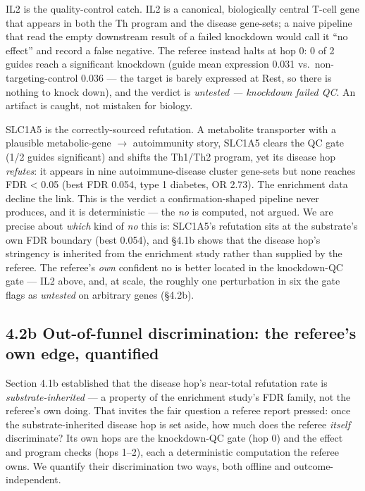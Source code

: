 IL2 is the quality-control catch. IL2 is a canonical, biologically central T-cell gene that appears in both
the Th program and the disease gene-sets; a naive pipeline that read the empty downstream result of a
failed knockdown would call it ``no effect'' and record a false negative. The referee instead halts at hop 0:
0 of 2 guides reach a significant knockdown (guide mean expression 0.031 vs.~non-targeting-control 0.036 ---
the target is barely expressed at Rest, so there is nothing to knock down), and the verdict is \emph{untested ---
knockdown failed QC}. An artifact is caught, not mistaken for biology.

SLC1A5 is the correctly-sourced refutation. A metabolite transporter with a plausible metabolic-gene $\rightarrow$
autoimmunity story, SLC1A5 clears the QC gate (1/2 guides significant) and shifts the Th1/Th2 program, yet
its disease hop \emph{refutes}: it appears in nine autoimmune-disease cluster gene-sets but none reaches
FDR \textless{} 0.05 (best FDR 0.054, type 1 diabetes, OR 2.73). The enrichment data decline the link. This is the
verdict a confirmation-shaped pipeline never produces, and it is deterministic --- the \emph{no} is computed, not
argued. We are precise about \emph{which} kind of \emph{no} this is: SLC1A5's refutation sits at the
substrate's own FDR boundary (best 0.054), and \S{}4.1b shows that the disease hop's stringency is inherited
from the enrichment study rather than supplied by the referee. The referee's \emph{own} confident no is
better located in the knockdown-QC gate --- IL2 above, and, at scale, the roughly one perturbation in six the
gate flags as \emph{untested} on arbitrary genes (\S{}4.2b).

\subsection*{4.2b Out-of-funnel discrimination: the referee's own edge, quantified}\label{out-of-funnel-discrimination-the-referees-own-edge-quantified}

Section 4.1b established that the disease hop's near-total refutation rate is \emph{substrate-inherited} --- a
property of the enrichment study's FDR family, not the referee's own doing. That invites the fair question a
referee report pressed: once the substrate-inherited disease hop is set aside, how much does the referee
\emph{itself} discriminate? Its own hops are the knockdown-QC gate (hop 0) and the effect and program checks
(hops 1--2), each a deterministic computation the referee owns. We quantify their discrimination two ways,
both offline and outcome-independent.

